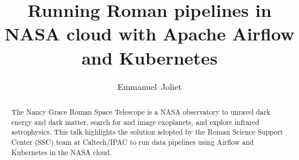 \documentclass[11pt,twoside]{article}
\begin{document}
\title{Running Roman pipelines in NASA cloud with Apache Airflow and Kubernetes}

\author{Emmanuel~Joliet}




\begin{abstract}
The Nancy Grace Roman Space Telescope is a NASA observatory to unravel dark energy and dark matter, search for and image exoplanets, and explore infrared astrophysics. This talk highlights the solution adopted by the Roman Science Support Center (SSC) team at Caltech/IPAC to run data pipelines using Airflow and Kubernetes in the NASA cloud.
\end{abstract}

\end{document}
